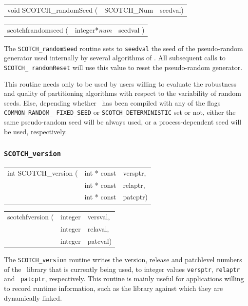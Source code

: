 \begin{itemize}
\progsyn

{\tt\begin{tabular}{l@{}ll}
void SCOTCH\_randomSeed ( & SCOTCH\_Num & seedval)
\end{tabular}}

{\tt\begin{tabular}{l@{}ll}
scotchfrandomseed ( & integer*{\it num} & seedval )
\end{tabular}}

\progdes

The {\tt SCOTCH\_randomSeed} routine sets to {\tt seedval} the
seed of the pseudo-random generator used internally by several
algorithms of \scotch. All subsequent calls to {\tt SCOTCH\_\lbt
random\lbt Reset} will use this value to reset the pseudo-random
generator.

This routine needs only to be used by users willing to evaluate
the robustness and quality of partitioning algorithms with respect to
the variability of random seeds. Else, depending whether \scotch\ has
been compiled with any of the flags {\tt COMMON\_\lbt RANDOM\_\lbt
FIXED\_\lbt SEED} or {\tt SCOTCH\_\lbt DETERMINISTIC} set or not,
either the same pseudo-random seed will be always used, or a
process-dependent seed will be used, respectively.
\end{itemize}

\subsubsection{{\tt SCOTCH\_version}}

\begin{itemize}
\progsyn

{\tt\begin{tabular}{l@{}ll}
int SCOTCH\_version ( & int * const & versptr, \\
                      & int * const & relaptr, \\
                      & int * const & patcptr)
\end{tabular}}

{\tt\begin{tabular}{l@{}ll}
scotchfversion ( & integer & versval, \\
                 & integer & relaval, \\
                 & integer & patcval)
\end{tabular}}

\progdes

The {\tt SCOTCH\_version} routine writes the version, release and
patchlevel numbers of the \scotch\ library that is currently being
used, to integer values {\tt *versptr}, {\tt *relaptr} and {\tt
patcptr}, respectively. This routine is mainly useful for applications
willing to record runtime information, such as the library against
which they are dynamically linked.
\end{itemize}

